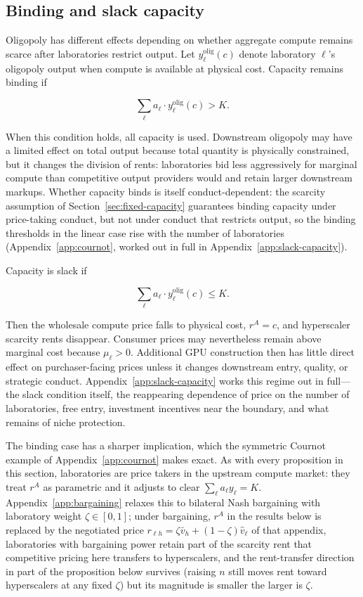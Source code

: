 \documentclass[11pt]{article}
\begin{document}
\subsection{Binding and slack capacity}

Oligopoly has different effects depending on whether aggregate compute remains scarce after laboratories restrict output. Let $y_\ell^{\mathrm{olig}}(c)$ denote laboratory $\ell$'s oligopoly output when compute is available at physical cost. Capacity remains binding if

\begin{equation}\sum_\ell a_\ell\cdot y_\ell^{\mathrm{olig}}(c)>K.\end{equation}

When this condition holds, all capacity is used. Downstream oligopoly may have a limited effect on total output because total quantity is physically constrained, but it changes the division of rents: laboratories bid less aggressively for marginal compute than competitive output providers would and retain larger downstream markups. Whether capacity binds is itself conduct-dependent: the scarcity assumption of Section~\ref{sec:fixed-capacity} guarantees binding capacity under price-taking conduct, but not under conduct that restricts output, so the binding thresholds in the linear case rise with the number of laboratories (Appendix~\ref{app:cournot}, worked out in full in Appendix~\ref{app:slack-capacity}).

Capacity is slack if

\begin{equation}\sum_\ell a_\ell\cdot y_\ell^{\mathrm{olig}}(c)\leq K.\end{equation}

Then the wholesale compute price falls to physical cost, $r^A=c$, and hyperscaler scarcity rents disappear. Consumer prices may nevertheless remain above marginal cost because $\mu_\ell>0$. Additional GPU construction then has little direct effect on purchaser-facing prices unless it changes downstream entry, quality, or strategic conduct. Appendix~\ref{app:slack-capacity} works this regime out in full---the slack condition itself, the reappearing dependence of price on the number of laboratories, free entry, investment incentives near the boundary, and what remains of niche protection.

The binding case has a sharper implication, which the symmetric Cournot example of Appendix~\ref{app:cournot} makes exact. As with every proposition in this section, laboratories are price takers in the upstream compute market: they treat $r^A$ as parametric and it adjusts to clear $\sum_\ell a_\ell y_\ell=K$. Appendix~\ref{app:bargaining} relaxes this to bilateral Nash bargaining with laboratory weight $\zeta\in[0,1]$; under bargaining, $r^A$ in the results below is replaced by the negotiated price $r_{\ell h}=\zeta\bar v_h+(1-\zeta)\widehat v_\ell$ of that appendix, laboratories with bargaining power retain part of the scarcity rent that competitive pricing here transfers to hyperscalers, and the rent-transfer direction in part of the proposition below survives (raising $n$ still moves rent toward hyperscalers at any fixed $\zeta$) but its magnitude is smaller the larger is $\zeta$.
\end{document}
